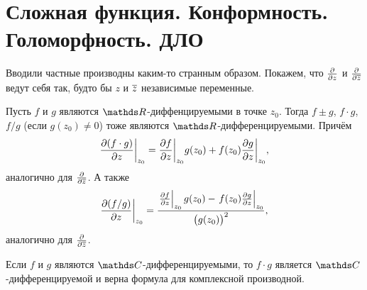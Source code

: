 \section{Сложная функция. Конформность. Голоморфность. ДЛО}
Вводили частные производны каким-то странным образом. Покажем, что $\frac{\partial }{\partial z}$ и $\frac{\partial  }{\partial \overline{z}}$ ведут себя так, будто бы $z$ и $\overline{z}$ независимые переменные.
\begin{Pre}
	Пусть $f$ и $g$ являются $\R$-диффенцируемыми в точке $z_0$. Тогда $f\pm g$, $f\cdot g$, $f/g$ (если $g(z_0)\ne 0$) тоже являются $\R$-дифференцируемыми. Причём
	\[
		\frac{\partial (f\cdot g)}{\partial z}\bigg|_{z_0} = \frac{\partial f}{\partial z}\bigg|_{z_0} g(z_0) + f(z_0)\frac{\partial g}{\partial z}\bigg|_{z_0},
	\] аналогично для $\frac{\partial  }{\partial \overline{z}}$.  А также
	\[
		\frac{\partial (f/g)}{\partial z}\bigg|_{z_0} = \frac{\left.\frac{\partial f}{\partial z}\right|_{z_0}g(z_0) - \left.f(z_0)\frac{\partial g}{\partial z}\right|_{z_0}}{\big(g(z_0)\big)^2},
	\]
	аналогично для $\frac{\partial  }{\partial \overline{z}}$.
\end{Pre}
\begin{Sl}
	Если $f$ и $g$ являются $\C$-дифференцируемыми, то $f\cdot g$ является $\C$-дифференцируемой и верна формула для комплексной производной.
\end{Sl}

